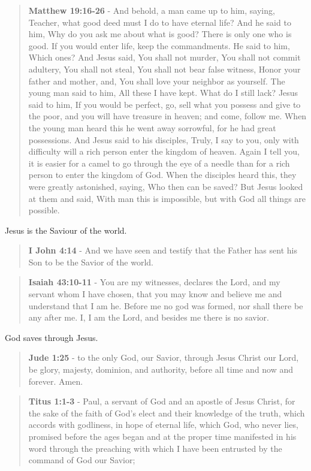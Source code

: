 \documentclass[11pt]{article}
\begin{document}
\begin{quote}
\textbf{Matthew 19:16-26} - And behold, a man came up to him, saying, Teacher, what good deed must I do to have eternal life? And he said to him, Why do you ask me about what is good? There is only one who is good. If you would enter life, keep the commandments. He said to him, Which ones? And Jesus said, You shall not murder, You shall not commit adultery, You shall not steal, You shall not bear false witness, Honor your father and mother, and, You shall love your neighbor as yourself. The young man said to him, All these I have kept. What do I still lack? Jesus said to him, If you would be perfect, go, sell what you possess and give to the poor, and you will have treasure in heaven; and come, follow me. When the young man heard this he went away sorrowful, for he had great possessions. And Jesus said to his disciples, Truly, I say to you, only with difficulty will a rich person enter the kingdom of heaven. Again I tell you, it is easier for a camel to go through the eye of a needle than for a rich person to enter the kingdom of God. When the disciples heard this, they were greatly astonished, saying, Who then can be saved? But Jesus looked at them and said, With man this is impossible, but with God all things are possible.
\end{quote}

Jesus is the Saviour of the world.

\begin{quote}
\textbf{I John 4:14} - And we have seen and testify that the Father has sent his Son to be the Savior of the world.
\end{quote}

\begin{quote}
\textbf{Isaiah 43:10-11} - You are my witnesses, declares the Lord, and my servant whom I have chosen, that you may know and believe me and understand that I am he. Before me no god was formed, nor shall there be any after me. I, I am the Lord, and besides me there is no savior.
\end{quote}

God saves through Jesus. 

\begin{quote}
\textbf{Jude 1:25} - to the only God, our Savior, through Jesus Christ our Lord, be glory, majesty, dominion, and authority, before all time and now and forever. Amen.
\end{quote}

\begin{quote}
\textbf{Titus 1:1-3} - Paul, a servant of God and an apostle of Jesus Christ, for the sake of the faith of God's elect and their knowledge of the truth, which accords with godliness, in hope of eternal life, which God, who never lies, promised before the ages began and at the proper time manifested in his word through the preaching with which I have been entrusted by the command of God our Savior;
\end{quote}
\end{document}
